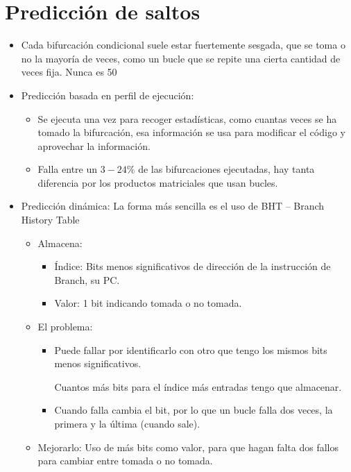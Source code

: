 \documentclass[12pt, twoside, openright]{report} %
\begin{document}
\section{Predicción de saltos}

\begin{itemize}
	\item Cada bifurcación condicional suele estar fuertemente sesgada, que se toma o no la mayoría de veces, como un bucle que se repite una cierta cantidad de veces fija. Nunca es 50%
	\item Predicción basada en perfil de ejecución:
	      \begin{itemize}
		      \item Se ejecuta una vez para recoger estadísticas, como cuantas veces se ha tomado la bifurcación, esa información se usa para modificar el código y aprovechar la información.
		      \item Falla entre un $3-24\%$ de las bifurcaciones ejecutadas, hay tanta diferencia por los productos matriciales que usan bucles.
	      \end{itemize}

	\item Predicción dinámica: La forma más sencilla es el uso de BHT – Branch History Table
	      \begin{itemize}
		      \item Almacena:
		            \begin{itemize}
			            \item Índice: Bits menos significativos de dirección de la instrucción de Branch, su PC.
			            \item Valor: 1 bit indicando tomada o no tomada.
		            \end{itemize}

		      \item El problema:
		            \begin{itemize}
			            \item Puede fallar por identificarlo con otro que tengo los mismos bits menos significativos.

			                  Cuantos más bits para el índice más entradas tengo que almacenar.
			            \item Cuando falla cambia el bit, por lo que un bucle falla dos veces, la primera y la última (cuando sale).
		            \end{itemize}

		      \item Mejorarlo: Uso de más bits como valor, para que hagan falta dos fallos para cambiar entre tomada o no tomada.


\end{itemize}
\end{itemize}
\end{document}
